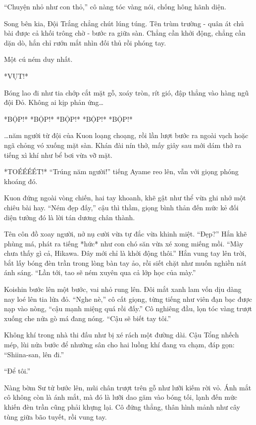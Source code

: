 \documentclass[../main.tex]{subfiles}
\begin{document}
``Chuyện nhỏ như con thỏ,'' cô nàng tóc vàng nói, chống hông hãnh diện.

Song bên kia, Đội Trắng chẳng chút lúng túng. Tên trùm trường - quân át chủ bài được cả khối trông chờ - bước ra giữa sàn. Chẳng cần khởi động, chẳng cần dặn dò, hắn chỉ rướn mắt nhìn đối thủ rồi phóng tay.

Một cú ném duy nhất.

*VỤT!*

Bóng lao đi như tia chớp cắt mặt gỗ, xoáy tròn, rít gió, đập thẳng vào hàng ngũ đội Đỏ. Không ai kịp phản ứng\dots

*BỘP!* *BỘP!* *BỘP!* *BỘP!* *BỘP!*

\dots năm người từ đội của Kuon loạng choạng, rồi lần lượt bước ra ngoài vạch hoặc ngã chỏng vó xuống mặt sàn. Khán đài nín thở, mấy giây sau mới dám thở ra tiếng xì khí như bể bơi vừa vỡ mặt.

*TOÉÉÉÉT!* ``Trúng năm người!'' tiếng Ayame reo lên, vẫn với giọng phóng khoáng đó.

Kuon đứng ngoài vòng chiến, hai tay khoanh, khẽ gật như thể vừa ghi nhớ một chiêu bài hay. ``Ném đẹp đấy,'' cậu thì thầm, giọng bình thản đến mức kẻ đối diện tưởng đó là lời tán dương chân thành.

Tên côn đồ xoay người, nở nụ cười vừa tự đắc vừa khinh miệt. ``Đẹp?'' Hắn khẽ phùng má, phát ra tiếng *hức* như con chó săn vừa xé xong miếng mồi. ``Mày chưa thấy gì cả, Hikawa. Đây mới chỉ là khởi động thôi.'' Hắn vung tay lên trời, bắt lấy bóng đèn trần trong lòng bàn tay ảo, rồi siết chặt như muốn nghiền nát ánh sáng. ``Lần tới, tao sẽ ném xuyên qua cả lớp học của mày.''

Koishin bước lên một bước, vai nhỏ rung lên. Đôi mắt xanh lam vốn dịu dàng nay loé lên tia lửa đỏ. ``Nghe nè,'' cô cất giọng, từng tiếng như viên đạn bạc được nạp vào nòng, ``cậu mạnh miệng quá rồi đấy.'' Cô nghiêng đầu, lọn tóc vàng trượt xuống che nửa gò má đang nóng. ``Cậu sẽ biết tay tôi.''

Không khí trong nhà thi đấu như bị xé rách một đường dài. Cậu Tổng nhếch mép, lùi nửa bước để nhường sân cho hai luồng khí đang va chạm, đáp gọn: ``Shiina-san, lên đi.''

``Để tôi.''

Nàng bờm Sư tử bước lên, mũi chân trượt trên gỗ như lưỡi kiếm rời vỏ. Ánh mắt cô không còn là ánh mắt, mà đó là lưỡi dao găm vào bóng tối, lạnh đến mức khiến đèn trần cũng phải khựng lại. Cô đứng thẳng, thân hình mảnh như cây tùng giữa bão tuyết, rồi vung tay.
\end{document}
